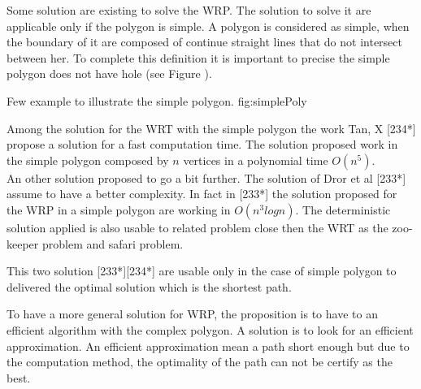 Some solution are existing to solve the WRP. The solution to solve it are applicable only if the polygon is simple. A polygon is considered as simple, when the boundary of it are composed of continue straight lines that do not intersect between her. To complete this definition it is important to precise the simple polygon does not have hole (see Figure ). 
 \begin{mfigures}[!]
{Few example to illustrate the simple polygon. }{fig:simplePoly} \centering
{}
\hspace{1cm}
\hspace{1cm}
\end{mfigures}	

Among the solution for the WRT with the simple polygon the work Tan, X [234*]\cite{} propose a solution for a fast computation time. The solution proposed work in the simple polygon composed by $n$ vertices in a polynomial time $O(n^5)$. \\
An other solution proposed to go a bit further. The solution of Dror et al [233*]\cite{} assume to have a better complexity. In fact in [233*]\cite{} the solution proposed for the WRP in a simple polygon are working in $O(n^3 log n)$.  The deterministic solution applied is also usable to related problem close then the WRT as the zoo-keeper problem and safari problem.

This two solution [233*][234*] are usable only in the case of simple polygon to delivered the optimal solution which is the shortest path. 

To have a more general solution for WRP, the proposition is to have to an efficient algorithm with the complex polygon. A solution is to look for an efficient approximation. An efficient approximation mean a path short enough but due to the computation method, the optimality of the path can not be certify as the best.

